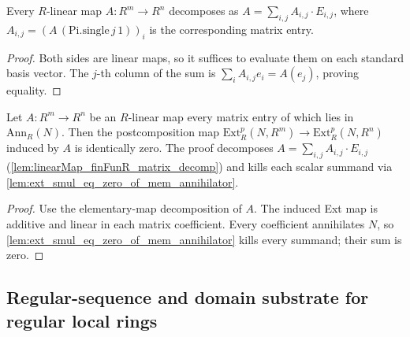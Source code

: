 \begin{lemma}\leanok
  \label{lem:linearMap_finFunR_matrix_decomp}
  Every \(R\)-linear map \(A : R^m \to R^n\) decomposes as
  \(A = \sum_{i,j} A_{i,j} \cdot E_{i,j}\), where \(A_{i,j} = (A\,(\text{Pi.single}\,j\,1))_i\)
  is the corresponding matrix entry.
\end{lemma}
\begin{proof}

\leanok
  Both sides are linear maps, so it suffices to evaluate them on
  each standard basis vector. The \(j\)-th column of the sum is
  \(\sum_i A_{i,j}e_i=A(e_j)\), proving equality.
\end{proof}

\begin{lemma}\leanok
  \label{lem:ext_comp_mk_zero_ofHom_eq_zero_of_entries_mem_annihilator}
  Let \(A : R^m \to R^n\) be an \(R\)-linear map every matrix entry of which lies in
  \(\text{Ann}_R(N)\). Then the postcomposition map
  \(\text{Ext}^p_R(N, R^m) \to \text{Ext}^p_R(N, R^n)\) induced by \(A\) is identically
  zero. The proof decomposes \(A = \sum_{i,j} A_{i,j} \cdot E_{i,j}\)
  (\cref{lem:linearMap_finFunR_matrix_decomp}) and kills each scalar summand via
  \cref{lem:ext_smul_eq_zero_of_mem_annihilator}.
\end{lemma}
\begin{proof}

\leanok
  Use the elementary-map decomposition of \(A\). The induced Ext map
  is additive and linear in each matrix coefficient. Every coefficient
  annihilates \(N\), so \cref{lem:ext_smul_eq_zero_of_mem_annihilator}
  kills every summand; their sum is zero.
\end{proof}

\subsection{Regular-sequence and domain substrate for regular local rings}
\label{subsec:ab_regular_domain_substrate}

